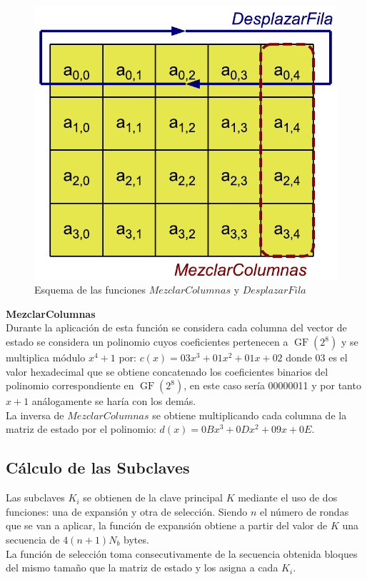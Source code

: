 \begin{description}
		\begin{figure}[htb]
			\centering
			\includegraphics[scale=0.4]{imagenes/aesdesplazarmezclar.png} 
			\caption{Esquema de las funciones $MezclarColumnas$ y $DesplazarFila$ \cite{En2011}}
			\label{desplazarymezclar}
		\end{figure}
	\item \textbf{MezclarColumnas}\\
		Durante la aplicación de esta función se considera cada columna del vector de estado se considera un polinomio cuyos coeficientes pertenecen a $\operatorname{GF}(2^8)$ y se multiplica módulo $x^4+1$ por: $c(x)=03x^3+01x^2+01x+02$ donde 03 es el valor hexadecimal que se obtiene concatenado los coeficientes binarios del polinomio correspondiente en $\operatorname{GF}(2^8)$, en este caso sería 00000011 y por tanto $x+1$ análogamente se haría con los demás.\\
		La inversa de $MezclarColumnas$ se obtiene multiplicando cada columna de la matriz de estado por el polinomio: $d(x)=0Bx^3+0Dx^2+09x+0E$.

\end{description}

\subsection{Cálculo de las Subclaves}
Las subclaves $K_i$ se obtienen de la clave principal $K$ mediante el uso de dos funciones: una de expansión y otra de selección. Siendo $n$ el número de rondas que se van a aplicar, la función de expansión obtiene a partir del valor de $K$ una secuencia de $4(n+1)N_b$ bytes.\\
La función de selección toma consecutivamente de la secuencia obtenida bloques del mismo tamaño que la matriz de estado y los asigna a cada $K_i$.\\


